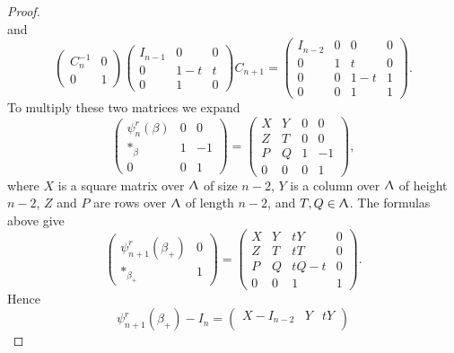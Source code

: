 \begin{proof}
\begin{displaymath}
\end{displaymath} and 
\begin{displaymath}
\begin{pmatrix} C_n^{-1} & 0 \\ 0 & 1 \end{pmatrix} \begin{pmatrix} I_{n-1} & 0 & 0 \\ 0 & 1-t & t \\ 0 & 1 & 0 \end{pmatrix} C_{n+1} = \begin{pmatrix} I_{n-2} & 0 & 0 & 0 \\ 0 & 1 & t & 0 \\ 0 & 0 & 1-t & 1 \\ 0 & 0 & 1 & 1 \end{pmatrix}.
\end{displaymath}
To multiply these two matrices we expand 
\begin{displaymath}
\begin{pmatrix} \psi_n^r(\beta) & 0 & 0 \\ *_{\beta} & 1 & -1 \\ 0 & 0 & 1 \end{pmatrix} = \begin{pmatrix} X & Y & 0 & 0 \\ Z & T & 0 & 0 \\ P & Q & 1 & -1 \\ 0 & 0 & 0 & 1 \end{pmatrix},
\end{displaymath}
where $X$ is a square matrix over $\Uplambda$ of size $n-2$, $Y$ is a column over $\Uplambda$ of height $n-2$, $Z$ and $P$ are rows over $\Uplambda$ of length $n-2$, and $T, Q \in \Uplambda$. The formulas above give 
\begin{displaymath}
\begin{pmatrix} \psi_{n+1}^r(\beta_+) & 0 \\ *_{\beta_+} & 1 \end{pmatrix} = \begin{pmatrix} X & Y & tY & 0 \\ Z & T & tT & 0 \\ P & Q & tQ-t & 0 \\ 0 & 0 & 1 & 1 \end{pmatrix}.
\end{displaymath}
Hence 
\begin{displaymath}
  \psi_{n+1}^r (\beta_+) - I_n = \begin{pmatrix} X-I_{n-2} & Y & tY \\

\end{pmatrix}
\end{displaymath}
\end{proof}
